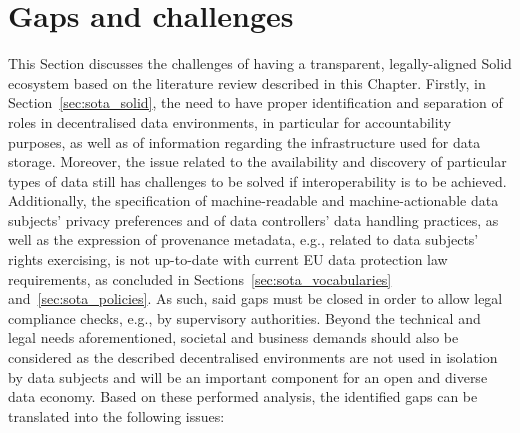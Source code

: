 \section{Gaps and challenges}
\label{sec:challenges}

This Section discusses the challenges of having a transparent, legally-aligned Solid ecosystem based on the literature review described in this Chapter.
Firstly, in Section~\ref{sec:sota_solid}, the need to have proper identification and separation of roles in decentralised data environments, in particular for accountability purposes, as well as of information regarding the infrastructure used for data storage.
Moreover, the issue related to the availability and discovery of particular types of data still has challenges to be solved if interoperability is to be achieved.
Additionally, the specification of machine-readable and machine-actionable data subjects' privacy preferences and of data controllers' data handling practices, as well as the expression of provenance metadata, e.g., related to data subjects' rights exercising, is not up-to-date with current EU data protection law requirements, as concluded in Sections~\ref{sec:sota_vocabularies} and~\ref{sec:sota_policies}.
As such, said gaps must be closed in order to allow legal compliance checks, e.g., by supervisory authorities.
Beyond the technical and legal needs aforementioned, societal and business demands should also be considered as the described decentralised environments are not used in isolation by data subjects and will be an important component for an open and diverse data economy.
Based on these performed analysis, the identified gaps can be translated into the following issues:

